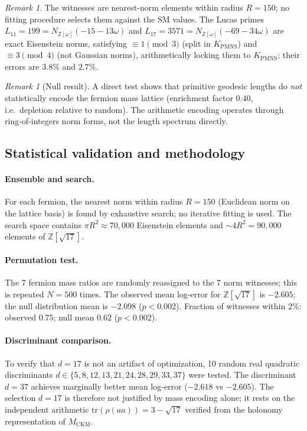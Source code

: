 \documentclass[11pt,a4paper]{article}
\theoremstyle{definition}
\theoremstyle{remark}
\newtheorem{remark}[theorem]{Remark}
\newcommand{\MCKM}{M_{\mathrm{CKM}}}
\newcommand{\KPMNS}{K_{\mathrm{PMNS}}}
\newcommand{\Zom}{\mathbb{Z}[\omega]}
\newcommand{\Zsev}{\mathbb{Z}[\sqrt{17}]}
\begin{document}
\begin{remark}
The witnesses are nearest-norm elements within radius $R=150$;
no fitting procedure selects them against the SM values.
The Lucas primes $L_{11}=199=N_{\Zom}(-15-13\omega)$ and
$L_{17}=3571=N_{\Zom}(-69-34\omega)$ are exact Eisenstein norms,
satisfying $\equiv1\pmod3$ (split in $\KPMNS$) and
$\equiv3\pmod4$ (not Gaussian norms), arithmetically locking
them to $\KPMNS$; their errors are $3.8\%$ and $2.7\%$.
\end{remark}

\begin{remark}[Null result]
A direct test shows that primitive geodesic lengths do
\emph{not} statistically encode the fermion mass lattice
(enrichment factor $0.40$, i.e.\ depletion relative to random).
The arithmetic encoding operates through ring-of-integers
norm forms, not the length spectrum directly.
\end{remark}

\subsection{Statistical validation and methodology}

\paragraph{Ensemble and search.}
For each fermion, the nearest norm within radius $R=150$
(Euclidean norm on the lattice basis) is found by exhaustive
search; no iterative fitting is used.
The search space contains $\pi R^2 \approx 70{,}000$ Eisenstein
elements and $\sim 4R^2 = 90{,}000$ elements of $\Zsev$.

\paragraph{Permutation test.}
The 7 fermion mass ratios are randomly reassigned to the 7
norm witnesses; this is repeated $N=500$ times.
The observed mean log-error for $\Zsev$ is $-2.605$; the
null distribution mean is $-2.098$ ($p<0.002$).
Fraction of witnesses within $2\%$: observed $0.75$;
null mean $0.62$ ($p<0.002$).

\paragraph{Discriminant comparison.}
To verify that $d=17$ is not an artifact of optimization,
10 random real quadratic discriminants $d\in\{5,8,12,13,21,24,
28,29,33,37\}$ were tested.
The discriminant $d=37$ achieves marginally better mean
log-error ($-2.618$ vs $-2.605$).
The selection $d=17$ is therefore not justified by mass
encoding alone; it rests on the independent arithmetic
$\mathrm{tr}(\rho(aa))=3-\sqrt{17}$ verified from the
holonomy representation of $\MCKM$.
\end{document}
